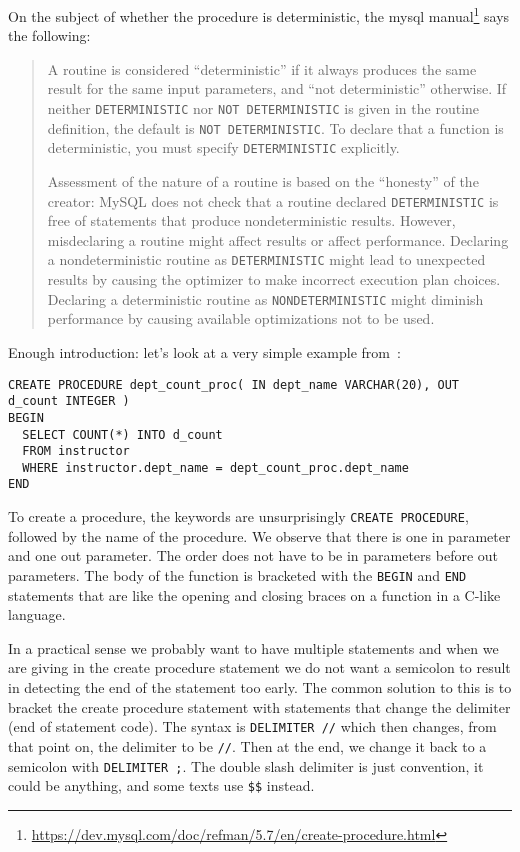 On the subject of whether the procedure is deterministic, the mysql manual\footnote{\url{https://dev.mysql.com/doc/refman/5.7/en/create-procedure.html}} says the following:

\begin{quote}
A routine is considered ``deterministic'' if it always produces the same result for the same input parameters, and ``not deterministic'' otherwise. If neither \texttt{DETERMINISTIC} nor \texttt{NOT DETERMINISTIC} is given in the routine definition, the default is \texttt{NOT DETERMINISTIC}. To declare that a function is deterministic, you must specify \texttt{DETERMINISTIC} explicitly.

Assessment of the nature of a routine is based on the ``honesty'' of the creator: MySQL does not check that a routine declared \texttt{DETERMINISTIC} is free of statements that produce nondeterministic results. However, misdeclaring a routine might affect results or affect performance. Declaring a nondeterministic routine as \texttt{DETERMINISTIC} might lead to unexpected results by causing the optimizer to make incorrect execution plan choices. Declaring a deterministic routine as \texttt{NONDETERMINISTIC} might diminish performance by causing available optimizations not to be used.
\end{quote}

Enough introduction: let's look at a very simple example from~\cite{dsc}:

{\small
\begin{verbatim}
CREATE PROCEDURE dept_count_proc( IN dept_name VARCHAR(20), OUT d_count INTEGER )
BEGIN
  SELECT COUNT(*) INTO d_count
  FROM instructor
  WHERE instructor.dept_name = dept_count_proc.dept_name
END
\end{verbatim}
}

To create a procedure, the keywords are unsurprisingly \texttt{CREATE PROCEDURE}, followed by the name of the procedure. We observe that there is one in parameter and one out parameter. The order does not have to be in parameters before out parameters. The body of the function is bracketed with the \texttt{BEGIN} and \texttt{END} statements that are like the opening and closing braces on a function in a C-like language.

In a practical sense we probably want to have multiple statements and when we are giving in the create procedure statement we do not want a semicolon to result in detecting the end of the statement too early. The common solution to this is to bracket the create procedure statement with statements that change the delimiter (end of statement code). The syntax is \texttt{DELIMITER //} which then changes, from that point on, the delimiter to be \texttt{//}. Then at the end, we change it back to a semicolon with \texttt{DELIMITER ;}. The double slash delimiter is just convention, it could be anything, and some texts use \texttt{\$\$} instead.

